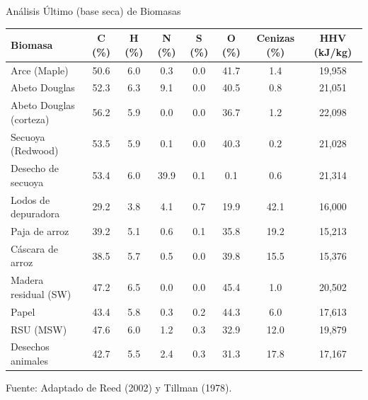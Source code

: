 \documentclass[../../main.tex]{subfiles}
\begin{document}
\begin{frame}{Análisis Último (base seca) de Biomasas}
\scriptsize
\centering
\begin{tabular}{lccccccc}
\toprule
\textbf{Biomasa} & \textbf{C (\%)} & \textbf{H (\%)} & \textbf{N (\%)} & \textbf{S (\%)} & \textbf{O (\%)} & \textbf{Cenizas (\%)} & \textbf{HHV (kJ/kg)} \\
\midrule
Arce (Maple)            & 50.6 & 6.0 & 0.3 & 0.0 & 41.7 & 1.4 & 19,958 \\
Abeto Douglas           & 52.3 & 6.3 & 9.1 & 0.0 & 40.5 & 0.8 & 21,051 \\
Abeto Douglas (corteza) & 56.2 & 5.9 & 0.0 & 0.0 & 36.7 & 1.2 & 22,098 \\
Secuoya (Redwood)       & 53.5 & 5.9 & 0.1 & 0.0 & 40.3 & 0.2 & 21,028 \\
Desecho de secuoya      & 53.4 & 6.0 & 39.9 & 0.1 & 0.1 & 0.6 & 21,314 \\
Lodos de depuradora     & 29.2 & 3.8 & 4.1 & 0.7 & 19.9 & 42.1 & 16,000 \\
Paja de arroz           & 39.2 & 5.1 & 0.6 & 0.1 & 35.8 & 19.2 & 15,213 \\
Cáscara de arroz        & 38.5 & 5.7 & 0.5 & 0.0 & 39.8 & 15.5 & 15,376 \\
Madera residual (SW)    & 47.2 & 6.5 & 0.0 & 0.0 & 45.4 & 1.0 & 20,502 \\
Papel                   & 43.4 & 5.8 & 0.3 & 0.2 & 44.3 & 6.0 & 17,613 \\
RSU (MSW)               & 47.6 & 6.0 & 1.2 & 0.3 & 32.9 & 12.0 & 19,879 \\
Desechos animales       & 42.7 & 5.5 & 2.4 & 0.3 & 31.3 & 17.8 & 17,167 \\
\bottomrule
\end{tabular}

\vspace{0.8em}
\scriptsize{Fuente: Adaptado de Reed (2002) y Tillman (1978).}
\end{frame}
\end{document}
